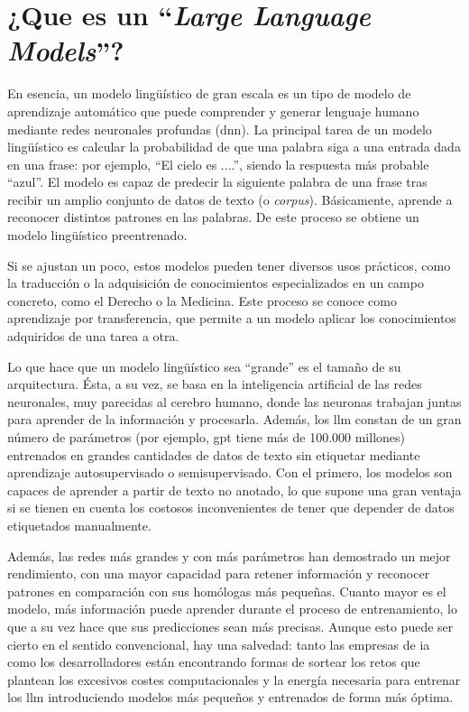 \section{¿Que es un ``\textit{Large Language Models}''?}

En esencia, un modelo lingüístico de gran escala es un tipo de modelo de aprendizaje automático que puede comprender y generar lenguaje humano mediante redes neuronales profundas (\acrlong{dnn}). La principal tarea de un modelo lingüístico es calcular la probabilidad de que una palabra siga a una entrada dada en una frase: por ejemplo, ``El cielo es ....'', siendo la respuesta más probable ``azul''. El modelo es capaz de predecir la siguiente palabra de una frase tras recibir un amplio conjunto de datos de texto (o \textit{corpus}). Básicamente, aprende a reconocer distintos patrones en las palabras. De este proceso se obtiene un modelo lingüístico preentrenado.

Si se ajustan un poco, estos modelos pueden tener diversos usos prácticos, como la traducción o la adquisición de conocimientos especializados en un campo concreto, como el Derecho o la Medicina. Este proceso se conoce como aprendizaje por transferencia, que permite a un modelo aplicar los conocimientos adquiridos de una tarea a otra.

Lo que hace que un modelo lingüístico sea ``grande'' es el tamaño de su arquitectura. Ésta, a su vez, se basa en la inteligencia artificial de las redes neuronales, muy parecidas al cerebro humano, donde las neuronas trabajan juntas para aprender de la información y procesarla. Además, los \acrshort{llm} constan de un gran número de parámetros (por ejemplo, \acrshort{gpt} tiene más de 100.000 millones) entrenados en grandes cantidades de datos de texto sin etiquetar mediante aprendizaje autosupervisado o semisupervisado. Con el primero, los modelos son capaces de aprender a partir de texto no anotado, lo que supone una gran ventaja si se tienen en cuenta los costosos inconvenientes de tener que depender de datos etiquetados manualmente.

Además, las redes más grandes y con más parámetros han demostrado un mejor rendimiento, con una mayor capacidad para retener información y reconocer patrones en comparación con sus homólogas más pequeñas. Cuanto mayor es el modelo, más información puede aprender durante el proceso de entrenamiento, lo que a su vez hace que sus predicciones sean más precisas. Aunque esto puede ser cierto en el sentido convencional, hay una salvedad: tanto las empresas de \acrshort{ia} como los desarrolladores están encontrando formas de sortear los retos que plantean los excesivos costes computacionales y la energía necesaria para entrenar los \acrshort{llm} introduciendo modelos más pequeños y entrenados de forma más óptima.


